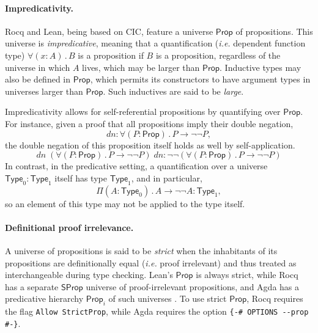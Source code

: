\documentclass{article}
\makeatletter
\newcommand{\ie}{\textit{i.e.}\@\xspace}
\newcommand{\kw}[1]{\mathsf{#1}}
\newcommand{\code}[1]{\texttt{#1}}
\makeatother
\begin{document}
\paragraph{Impredicativity.}
Rocq and Lean, being based on CIC,
feature a universe $\kw{Prop}$ of propositions.
This universe is \emph{impredicative},
meaning that a quantification (\ie dependent function type)
$\forall (x : A) \mathpunct{.} B$ is a proposition if $B$ is a proposition,
regardless of the universe in which $A$ lives,
which may be larger than $\kw{Prop}$.
Inductive types may also be defined in $\kw{Prop}$,
which permits its constructors to have argument types
in universes larger than $\kw{Prop}$.
Such inductives are said to be \emph{large}.

Impredicativity allows for self-referential propositions by quantifying over $\kw{Prop}$.
For instance, given a proof that all propositions imply their double negation,
$$\mathit{dn}: \forall (P : \kw{Prop})\mathpunct{.} P \to \neg \neg P,$$
the double negation of this proposition itself holds as well by self-application.
$$\mathit{dn} \; (\forall (P : \kw{Prop})\mathpunct{.} P \to \neg \neg P) \; \mathit{dn} : \neg \neg (\forall (P : \kw{Prop})\mathpunct{.} P \to \neg \neg P)$$
In contrast, in the predicative setting,
a quantification over a universe $\kw{Type}_0 : \kw{Type}_1$ itself has type $\kw{Type}_1$,
and in particular,
$$\Pi (A : \kw{Type}_0)\mathpunct{.} A \to \neg \neg A : \kw{Type}_1,$$
so an element of this type may not be applied to the type itself.

\paragraph{Definitional proof irrelevance.}
A universe of propositions is said to be \emph{strict}
when the inhabitants of its propositions are definitionally equal
(\ie proof irrelevant)
and thus treated as interchangeable during type checking.
Lean's $\kw{Prop}$ is always strict, while
Rocq has a separate $\kw{SProp}$ universe of proof-irrelevant propositions,
and Agda has a predicative hierarchy $\kw{Prop}_i$ of such universes \citep{sprop}.
To use strict $\kw{Prop}$,
Rocq requires the flag \code{Allow StrictProp},
while Agda requires the option \code{\{-\# OPTIONS -{}-prop \#-\}}.
\end{document}
